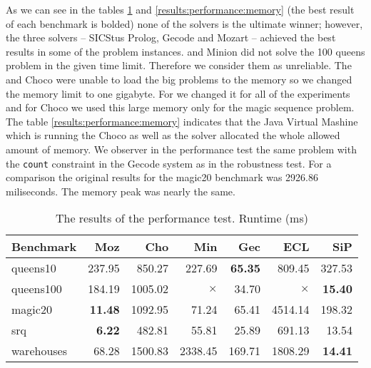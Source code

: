 As we can see in the tables \ref{results:performance:runtime} and \ref{results:performance:memory} (the best result of each benchmark is bolded) none 
of the solvers is the ultimate winner; however, the three solvers -- SICStus Prolog, Gecode and 
Mozart -- achieved the best results in some of the problem instances. \eclipse and
Minion did not solve the 100 queens problem in the given time limit. Therefore we 
consider them as unreliable. The \eclipse and Choco were unable to load the big problems
to the memory so we changed the memory limit to one gigabyte. For \eclipse we changed it for all of the
experiments and for Choco we used this large memory only for the magic sequence problem.
The table \ref{results:performance:memory} indicates that the Java Virtual Mashine which
is running the Choco as well as the \eclipse solver allocated the whole allowed
amount of memory. We observer in the performance test the same problem with the \texttt{count}
constraint in the Gecode system as in the robustness test. For a comparison the original
results for the magic20 benchmark was 2926.86 miliseconds. The memory peak was nearly the same.

\begin{table}
\caption{\label{results:performance:runtime}The results of the performance test. Runtime (ms)}
\begin{center}
\begin{tabular}{lrrrrrr}
\hline Benchmark & Moz & Cho & Min & Gec & ECL & SiP \\
\hline queens10 & 237.95 & 850.27 & 227.69 & {\bf 65.35} & 809.45 & 327.53 \\
	queens100 & 184.19 & 1005.02 & $\times$ & 34.70 & $\times$ & {\bf 15.40} \\
	magic20 & {\bf 11.48} & 1092.95 & 71.24 & 65.41 & 4514.14 & 198.32 \\
	srq & {\bf 6.22} & 482.81 & 55.81 & 25.89 & 691.13 & 13.54 \\
	warehouses & 68.28 & 1500.83 & 2338.45 & 169.71 & 1808.29 & {\bf 14.41} \\  
\hline 
\end{tabular}
\end{center}
\end{table}

